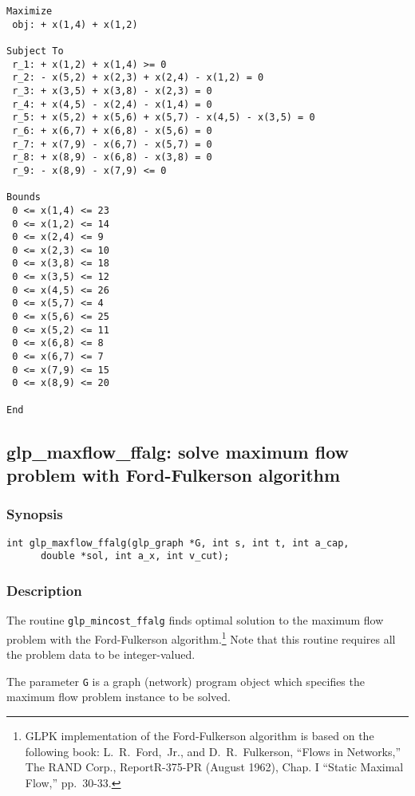\begin{verbatim}
Maximize
 obj: + x(1,4) + x(1,2)

Subject To
 r_1: + x(1,2) + x(1,4) >= 0
 r_2: - x(5,2) + x(2,3) + x(2,4) - x(1,2) = 0
 r_3: + x(3,5) + x(3,8) - x(2,3) = 0
 r_4: + x(4,5) - x(2,4) - x(1,4) = 0
 r_5: + x(5,2) + x(5,6) + x(5,7) - x(4,5) - x(3,5) = 0
 r_6: + x(6,7) + x(6,8) - x(5,6) = 0
 r_7: + x(7,9) - x(6,7) - x(5,7) = 0
 r_8: + x(8,9) - x(6,8) - x(3,8) = 0
 r_9: - x(8,9) - x(7,9) <= 0

Bounds
 0 <= x(1,4) <= 23
 0 <= x(1,2) <= 14
 0 <= x(2,4) <= 9
 0 <= x(2,3) <= 10
 0 <= x(3,8) <= 18
 0 <= x(3,5) <= 12
 0 <= x(4,5) <= 26
 0 <= x(5,7) <= 4
 0 <= x(5,6) <= 25
 0 <= x(5,2) <= 11
 0 <= x(6,8) <= 8
 0 <= x(6,7) <= 7
 0 <= x(7,9) <= 15
 0 <= x(8,9) <= 20

End
\end{verbatim}

\newpage

\subsection{glp\_maxflow\_ffalg: solve maximum flow problem with
Ford-Fulkerson algorithm}

\subsubsection*{Synopsis}

\begin{verbatim}
int glp_maxflow_ffalg(glp_graph *G, int s, int t, int a_cap,
      double *sol, int a_x, int v_cut);
\end{verbatim}

\subsubsection*{Description}

The routine \verb|glp_mincost_ffalg| finds optimal solution to the
maximum flow problem with the Ford-Fulkerson algorithm.\footnote{GLPK
implementation of the Ford-Fulkerson algorithm is based on the following
book: L.~R.~Ford,~Jr., and D.~R.~Fulkerson, ``Flows in Networks,'' The
RAND Corp., Report\linebreak R-375-PR (August 1962), Chap. I
``Static Maximal Flow,'' pp.~30-33.} Note that this routine requires all
the problem data to be integer-valued.

The parameter \verb|G| is a graph (network) program object which
specifies the maximum flow problem instance to be solved.

